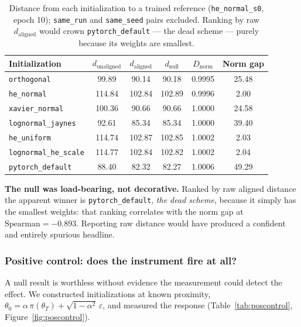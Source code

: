 \documentclass[11pt]{article}
\begin{document}
\begin{table}[htbp]\centering
\caption{Distance from each initialization to a trained reference (\texttt{he\_normal\_s0},
epoch 10); \texttt{same\_run} and \texttt{same\_seed} pairs excluded. Ranking by raw
$d_{\text{aligned}}$ would crown \texttt{pytorch\_default} --- the dead scheme --- purely because
its weights are smallest.}
\label{tab:dnorm}
\begin{tabular}{lccccc}
\toprule
Initialization & $d_{\text{unaligned}}$ & $d_{\text{aligned}}$ & $d_{\text{null}}$ &
$D_{\text{norm}}$ & Norm gap \\
\midrule
\texttt{orthogonal}          &  99.89 &  90.14 &  90.18 & 0.9995 & 25.48 \\
\texttt{he\_normal}          & 114.84 & 102.84 & 102.89 & 0.9996 &  2.00 \\
\texttt{xavier\_normal}      & 100.36 &  90.66 &  90.66 & 1.0000 & 24.58 \\
\texttt{lognormal\_jaynes}   &  92.61 &  85.34 &  85.34 & 1.0000 & 39.40 \\
\texttt{he\_uniform}         & 114.74 & 102.87 & 102.85 & 1.0002 &  2.03 \\
\texttt{lognormal\_he\_scale}& 114.77 & 102.84 & 102.82 & 1.0002 &  2.04 \\
\texttt{pytorch\_default}    &  88.40 &  82.32 &  82.27 & 1.0006 & 49.29 \\
\bottomrule
\end{tabular}
\end{table}

\textbf{The null was load-bearing, not decorative.} Ranked by raw aligned distance the apparent
winner is \texttt{pytorch\_default}, \emph{the dead scheme}, because it simply has the smallest
weights: that ranking correlates with the norm gap at $\mathrm{Spearman} = -0.893$. Reporting raw
distance would have produced a confident and entirely spurious headline.

\subsubsection{Positive control: does the instrument fire at all?}

A null result is worthless without evidence the measurement could detect the effect. We
constructed initializations at known proximity,
$\theta_0 = \alpha\,\pi(\theta_T) + \sqrt{1-\alpha^2}\,\varepsilon$, and measured the response
(Table~\ref{tab:poscontrol}, Figure~\ref{fig:poscontrol}).
\end{document}
